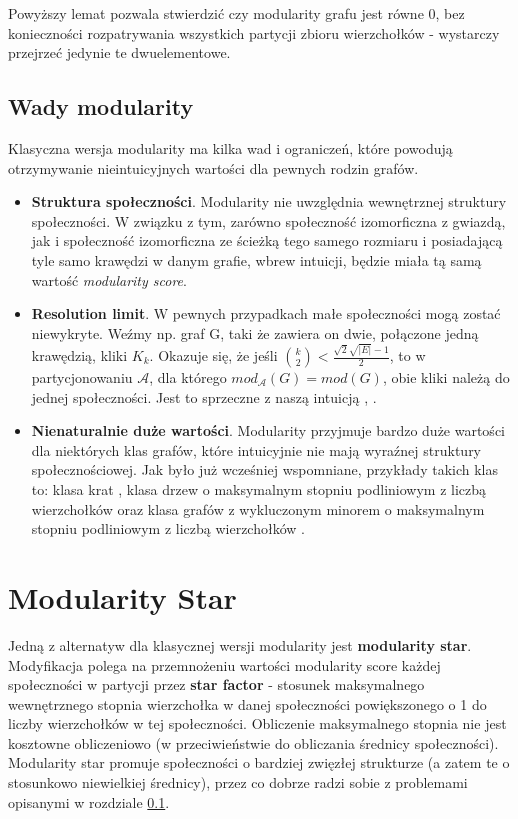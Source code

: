 \documentclass[letterpaper,12pt]{article}
\begin{document}
Powyższy lemat pozwala stwierdzić czy modularity grafu jest równe 0, bez konieczności rozpatrywania wszystkich partycji zbioru wierzchołków - wystarczy przejrzeć jedynie te dwuelementowe.\\

\subsection{Wady modularity} \label{wady}
Klasyczna wersja modularity ma kilka wad i ograniczeń, które powodują otrzymywanie nieintuicyjnych wartości dla pewnych rodzin grafów.
\begin{itemize}
  \item \textbf{Struktura społeczności}. Modularity nie uwzględnia wewnętrznej struktury społeczności. W związku z tym, zarówno społeczność izomorficzna z gwiazdą, jak i społeczność izomorficzna ze ścieżką tego samego rozmiaru i posiadającą tyle samo krawędzi  w danym grafie, wbrew intuicji, będzie miała tą samą wartość \textit{modularity score}.
  \item \textbf{Resolution limit}. W pewnych przypadkach małe społeczności mogą zostać niewykryte. Weźmy np. graf G, taki że zawiera on dwie, połączone jedną krawędzią, kliki \(K_k\). Okazuje się, że jeśli \(\binom{k}{2} < \frac{\sqrt{2}\sqrt{|E|}-1}{2}\), to w partycjonowaniu \(\mathcal{A}\), dla którego \(mod_{\mathcal{A}}(G)=mod(G)\), obie kliki należą do jednej społeczności. Jest to sprzeczne z naszą intuicją \cite[Twierdzenie 2]{K24}, \cite{FB07}.
  \item \textbf{Nienaturalnie duże wartości}. Modularity przyjmuje bardzo duże wartości dla niektórych klas grafów, które intuicyjnie nie mają wyraźnej struktury społecznościowej. Jak było już wcześniej wspomniane, przykłady takich klas to: klasa krat \cite[Twierdzenie 3]{K24}, klasa drzew o maksymalnym stopniu podliniowym z liczbą wierzchołków \cite{MS18} oraz klasa grafów z wykluczonym minorem o maksymalnym stopniu podliniowym z liczbą wierzchołków \cite{LS23}.
\end{itemize}

\section{Modularity Star}
Jedną z alternatyw dla klasycznej wersji modularity jest \textbf{modularity star}. Modyfikacja polega na przemnożeniu wartości modularity score każdej społeczności w partycji przez \textbf{star factor} - stosunek maksymalnego wewnętrznego stopnia wierzchołka w danej społeczności powiększonego o 1 do liczby wierzchołków w tej społeczności. Obliczenie maksymalnego stopnia nie jest kosztowne obliczeniowo (w przeciwieństwie do obliczania średnicy społeczności). Modularity star promuje społeczności o bardziej zwięzłej strukturze (a zatem te o stosunkowo niewielkiej średnicy), przez co dobrze radzi sobie z problemami opisanymi w rozdziale \ref{wady}.\\
\end{document}
